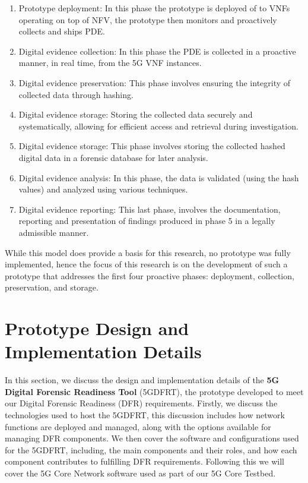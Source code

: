 \documentclass[final,1p,times,authoryear]{elsarticle}
\begin{document}
\begin{enumerate}
	\item Prototype deployment: In this phase the prototype is deployed of to VNFs operating on top of NFV, the prototype then monitors and proactively collects and ships PDE.
	\item Digital evidence collection: In this phase the PDE is collected in a proactive manner, in real time, from the 5G VNF instances.
	\item Digital evidence preservation: This phase involves ensuring the integrity of collected data through hashing.
	\item Digital evidence storage: Storing the collected data securely and systematically, allowing for efficient access and retrieval during investigation. 
	\item Digital evidence storage: This phase involves storing the collected hashed digital data in a forensic database for later analysis.
	\item Digital evidence analysis: In this phase, the data is validated (using the hash values) and analyzed using various techniques.
	\item Digital evidence reporting: This last phase, involves the documentation, reporting and presentation of findings produced in phase 5 in a legally admissible manner.
\end{enumerate}

While this model does provide a basis for this research, no prototype was fully implemented, hence the focus of this research is on the development of such a prototype that addresses the first four proactive phases: deployment, collection, preservation, and storage.

\newpage

\section{Prototype Design and Implementation Details}
\label{sec3}
In this section, we discuss the design and implementation details of the \textbf{5G Digital Forensic Readiness Tool} (5GDFRT), the prototype developed to meet our Digital Forensic Readiness (DFR) requirements. Firstly, we discuss the technologies used to host the 5GDFRT, this discussion includes how network functions are deployed and managed, along with the options available for managing DFR components. We then cover the software and configurations used for the 5GDFRT, including, the main components and their roles, and how each component contributes to fulfilling DFR requirements. Following this we will cover the 5G Core Network software used as part of our 5G Core Testbed.
\end{document}
